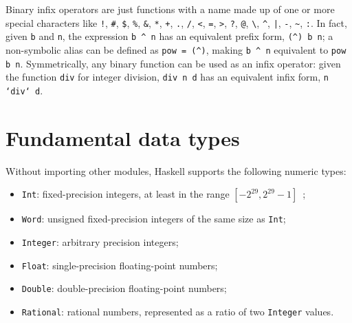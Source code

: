 \documentclass[UdineBachThesis,american,11pt]{PhdThesis}
\begin{document}
  Binary infix operators are just functions with a name made up of one or more
  special characters like \texttt{!}, \texttt{\#}, \texttt{\$}, \texttt{\%},
  \texttt{\&}, \texttt{*}, \texttt{+}, \texttt{.}, \texttt{/}, \texttt{<},
  \texttt{=}, \texttt{>}, \texttt{?}, \texttt{@}, \texttt{\textbackslash},
  \texttt{\textasciicircum}, \texttt{|}, \texttt{-}, \texttt{\textasciitilde},
  \texttt{:}. In fact, given \texttt{b} and \texttt{n}, the expression
  \mbox{\texttt{b {\textasciicircum} n}} has an equivalent prefix form,
  \mbox{\texttt{(\textasciicircum) b n}}; a non-symbolic alias can be defined as
  \mbox{\texttt{pow = (\textasciicircum)}}, making
  \mbox{\texttt{b {\textasciicircum} n}} equivalent to \mbox{\texttt{pow b n}}.
  Symmetrically, any binary function can be used as an infix operator: given the
  function \mbox{\texttt{div}} for integer division, \mbox{\texttt{div n d}} has
  an equivalent infix form, \mbox{\texttt{n `div` d}}.

  \section{Fundamental data types}

  Without importing other modules, Haskell supports the following numeric types:

  \begin{itemize}
    \item \mbox{\texttt{Int}}: fixed-precision integers, at least in the range
    \mbox{$\left[-2^{29}, 2^{29} - 1\right]$}~\cite{haskell-signed-integer-types};

    \item \mbox{\texttt{Word}}: unsigned fixed-precision integers of the same
    size as \mbox{\texttt{Int}};

    \item \mbox{\texttt{Integer}}: arbitrary precision integers;

    \item \mbox{\texttt{Float}}: single-precision floating-point numbers;

    \item \mbox{\texttt{Double}}: double-precision floating-point numbers;

    \item \mbox{\texttt{Rational}}: rational numbers, represented as a ratio of
    two \mbox{\texttt{Integer}} values.
  \end{itemize}
\end{document}
